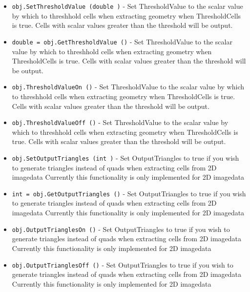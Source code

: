 \begin{itemize}
\item  \verb|obj.SetThresholdValue (double )| -  Set ThresholdValue to the scalar value by which to threshhold cells when extracting geometry
 when ThresholdCells is true. Cells with scalar values greater than the threshold will be output.

\item  \verb|double = obj.GetThresholdValue ()| -  Set ThresholdValue to the scalar value by which to threshhold cells when extracting geometry
 when ThresholdCells is true. Cells with scalar values greater than the threshold will be output.

\item  \verb|obj.ThresholdValueOn ()| -  Set ThresholdValue to the scalar value by which to threshhold cells when extracting geometry
 when ThresholdCells is true. Cells with scalar values greater than the threshold will be output.

\item  \verb|obj.ThresholdValueOff ()| -  Set ThresholdValue to the scalar value by which to threshhold cells when extracting geometry
 when ThresholdCells is true. Cells with scalar values greater than the threshold will be output.

\item  \verb|obj.SetOutputTriangles (int )| -  Set OutputTriangles to true if you wish to generate triangles instead of quads
 when extracting cells from 2D imagedata
 Currently this functionality is only implemented for 2D imagedata

\item  \verb|int = obj.GetOutputTriangles ()| -  Set OutputTriangles to true if you wish to generate triangles instead of quads
 when extracting cells from 2D imagedata
 Currently this functionality is only implemented for 2D imagedata

\item  \verb|obj.OutputTrianglesOn ()| -  Set OutputTriangles to true if you wish to generate triangles instead of quads
 when extracting cells from 2D imagedata
 Currently this functionality is only implemented for 2D imagedata

\item  \verb|obj.OutputTrianglesOff ()| -  Set OutputTriangles to true if you wish to generate triangles instead of quads
 when extracting cells from 2D imagedata
 Currently this functionality is only implemented for 2D imagedata

\end{itemize}
